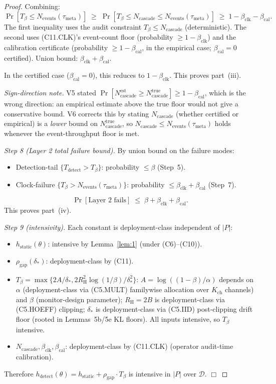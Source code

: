 \documentclass{article}
\newcommand{\deltastar}{\delta_{*}}
\newcommand{\rhogap}{\rho_{\mathrm{gap}}}
\newcommand{\Tbeta}{T_{\beta}}
\newcommand{\Ncasc}{N_{\mathrm{cascade}}}
\newcommand{\Nev}{N_{\mathrm{events}}}
\newcommand{\bclk}{\beta_{\mathrm{clk}}}
\newcommand{\bcal}{\beta_{\mathrm{cal}}}
\newcommand{\Bclip}{B}
\newcommand{\Rh}{R_{\mathrm{H}}}
\newcommand{\Kch}{K_{\mathrm{ch}}}
\begin{document}
\begin{proof}
Combining:
\[
  \Pr[\Tbeta \leq \Nev(\tau_{\mathrm{meta}})] \;\geq\;
  \Pr[\Tbeta \leq \Ncasc \leq \Nev(\tau_{\mathrm{meta}})]
  \;\geq\; 1 - \bclk - \bcal.
\]
The first inequality uses the audit constraint $\Tbeta \leq
\Ncasc$ (deterministic).  The second uses (C11.CLK)'s event-count
floor (probability $\geq 1 - \bclk$) and the calibration
certificate (probability $\geq 1 - \bcal$, in the empirical case;
$\bcal = 0$ certified).  Union bound: $\bclk + \bcal$.

In the certified case ($\bcal = 0$), this reduces to $1 - \bclk$.
This proves part~(iii).

\emph{Sign-direction note.}  V5 stated
$\Pr[\Ncasc^{\mathrm{est}} \geq \Ncasc^{\mathrm{true}}] \geq 1 -
\bcal$, which is the wrong direction: an empirical estimate above
the true floor would not give a conservative bound.  V6 corrects
this by stating $\Ncasc$ (whether certified or empirical) is a
\emph{lower} bound on $\Ncasc^{\mathrm{true}}$, so
$\Ncasc \leq \Nev(\tau_{\mathrm{meta}})$ holds whenever the
event-throughput floor is met.

\emph{Step 8 (Layer 2 total failure bound).}  By union bound on
the failure modes:
\begin{itemize}
\item Detection-tail $\{T_{\mathrm{detect}} > \Tbeta\}$:
  probability $\leq \beta$ (Step~5).
\item Clock-failure $\{\Tbeta > \Nev(\tau_{\mathrm{meta}})\}$:
  probability $\leq \bclk + \bcal$ (Step~7).
\end{itemize}
\[
  \Pr[\text{Layer~2 fails}] \;\leq\; \beta + \bclk + \bcal.
\]
This proves part~(iv).

\emph{Step 9 (intensivity).}  Each constant is deployment-class
independent of $|P|$:
\begin{itemize}
\item $h_{\mathrm{static}}(\theta)$: intensive by Lemma~\ref{lem:1}
  (under (C6)--(C10)).
\item $\rhogap(\deltastar)$: deployment-class by (C11).
\item $\Tbeta = \max\{2A/\deltastar, 2\Rh^2\log(1/\beta)/\deltastar^2\}$:
  $A = \log((1-\beta)/\alpha)$ depends on $\alpha$ (deployment-class
  via (C5.MULT) familywise allocation over $\Kch$ channels) and
  $\beta$ (monitor-design parameter); $\Rh = 2\Bclip$ is
  deployment-class via (C5.HOEFF) clipping; $\deltastar$ is
  deployment-class via (C5.IID) post-clipping drift floor (rooted
  in Lemmas~5b/5e KL floors).  All inputs intensive, so $\Tbeta$
  intensive.
\item $\Ncasc, \bclk, \bcal$: deployment-class by (C11.CLK)
  (operator audit-time calibration).
\end{itemize}
Therefore $h_{\mathrm{detect}}(\theta) = h_{\mathrm{static}} +
\rhogap \cdot \Tbeta$ is intensive in $|P|$ over $\mathcal{D}$.
$\Box$
\end{proof}
\end{document}
